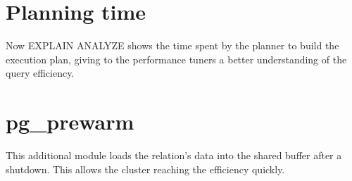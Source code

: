 \section{Planning time}
Now EXPLAIN ANALYZE shows the time spent by the planner to build the execution plan, giving to the
performance tuners a better understanding of the query efficiency.

\section{pg\_prewarm}
This additional module loads the relation's data into the shared buffer after a shutdown. This allows
the cluster reaching the efficiency quickly.

